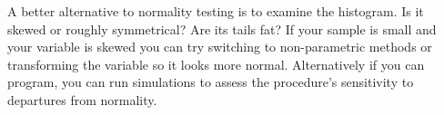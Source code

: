 \documentclass[xcolor={table},c]{beamer}
\begin{document}
\begin{frame}[shrink=6.5]
\begin{columns}
\begin{column}{0.5\textwidth}
{A better alternative to normality testing is to examine the histogram. Is it skewed or roughly symmetrical? Are its tails fat? If your sample is small and your variable is skewed you can try switching to non-parametric methods or transforming the variable so it looks more normal. Alternatively if you can program, you can run simulations to assess the procedure's sensitivity to departures from normality.}
\end{column}
\begin{column}{0.5\textwidth}
\end{column}
\end{columns}
\end{frame}
\end{document}
